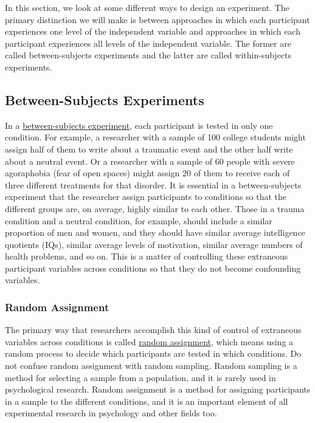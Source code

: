 \documentclass[
]{krantz}
\begin{document}
In this section, we look at some different ways to design an experiment. The primary distinction we will make is between approaches in which each participant experiences one level of the independent variable and approaches in which each participant experiences all levels of the independent variable. The former are called between-subjects experiments and the latter are called within-subjects experiments.

\subsection*{Between-Subjects Experiments}\label{between-subjects-experiments}


In a \hyperref[between-subjects-experiment]{between-subjects experiment}, each participant is tested in only one condition. For example, a researcher with a sample of 100 college students might assign half of them to write about a traumatic event and the other half write about a neutral event. Or a researcher with a sample of 60 people with severe agoraphobia (fear of open spaces) might assign 20 of them to receive each of three different treatments for that disorder. It is essential in a between-subjects experiment that the researcher assign participants to conditions so that the different groups are, on average, highly similar to each other. Those in a trauma condition and a neutral condition, for example, should include a similar proportion of men and women, and they should have similar average intelligence quotients (IQs), similar average levels of motivation, similar average numbers of health problems, and so on. This is a matter of controlling these extraneous participant variables across conditions so that they do not become confounding variables.

\subsubsection*{Random Assignment}\label{random-assignment}


The primary way that researchers accomplish this kind of control of extraneous variables across conditions is called \hyperref[random-assignment]{random assignment}, which means using a random process to decide which participants are tested in which conditions. Do not confuse random assignment with random sampling. Random sampling is a method for selecting a sample from a population, and it is rarely used in psychological research. Random assignment is a method for assigning participants in a sample to the different conditions, and it is an important element of all experimental research in psychology and other fields too.
\end{document}
